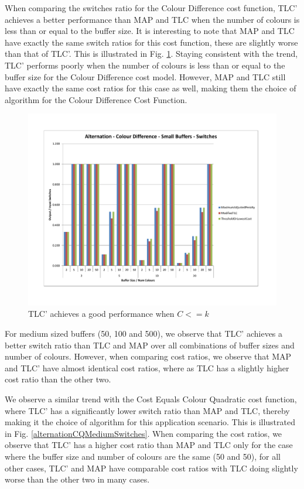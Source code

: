 When comparing the switches ratio for the Colour Difference cost function, TLC' achieves a better performance than MAP and TLC when the number of colours is less than or equal to the buffer size. It is interesting to note that MAP and TLC have exactly the same switch ratios for this cost function, these are slightly worse than that of TLC'. This is illustrated in Fig. \ref{alternationCDSmallSwitches}. Staying consistent with the trend, TLC' performs poorly when the number of colours is less than or equal to the buffer size for the Colour Difference cost model. However, MAP and TLC still have exactly the same cost ratios for this case as well, making them the choice of algorithm for the Colour Difference Cost Function. 

\begin{figure}[ht]
\centering 
\includegraphics[scale=0.60]{Alternation-cd-small-switches.pdf}
\caption{TLC' achieves a good performance when $C <= k$}
\label{alternationCDSmallSwitches}
\end{figure} 

For medium sized buffers (50, 100 and 500), we observe that TLC' achieves a better switch ratio than TLC and MAP over all combinations of buffer sizes and number of colours. However, when comparing cost ratios, we observe that MAP and TLC' have almost identical cost ratios, where as TLC has a slightly higher cost ratio than the other two.  

We observe a similar trend with the Cost Equals Colour Quadratic cost function, where TLC' has a significantly lower switch ratio than MAP and TLC, thereby making it the choice of algorithm for this application scenario. This is illustrated in Fig. \ref{alternationCQMediumSwitches}. When comparing the cost ratios, we observe that TLC' has a higher cost ratio than MAP and TLC only for the case where the buffer size and number of colours are the same (50 and 50), for all other cases, TLC' and MAP have comparable cost ratios with TLC doing slightly worse than the other two in many cases. 


